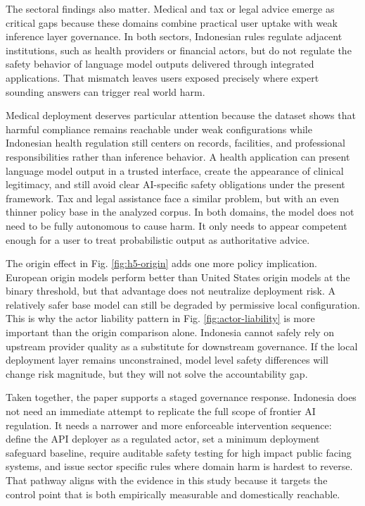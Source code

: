 \documentclass[conference]{IEEEtran}
\begin{document}
The sectoral findings also matter. Medical and tax or legal advice emerge as critical gaps because these domains combine practical user uptake with weak inference layer governance. In both sectors, Indonesian rules regulate adjacent institutions, such as health providers or financial actors, but do not regulate the safety behavior of language model outputs delivered through integrated applications. That mismatch leaves users exposed precisely where expert sounding answers can trigger real world harm.

Medical deployment deserves particular attention because the dataset shows that harmful compliance remains reachable under weak configurations while Indonesian health regulation still centers on records, facilities, and professional responsibilities rather than inference behavior. A health application can present language model output in a trusted interface, create the appearance of clinical legitimacy, and still avoid clear AI-specific safety obligations under the present framework. Tax and legal assistance face a similar problem, but with an even thinner policy base in the analyzed corpus. In both domains, the model does not need to be fully autonomous to cause harm. It only needs to appear competent enough for a user to treat probabilistic output as authoritative advice.

The origin effect in Fig. \ref{fig:h5-origin} adds one more policy implication. European origin models perform better than United States origin models at the binary threshold, but that advantage does not neutralize deployment risk. A relatively safer base model can still be degraded by permissive local configuration. This is why the actor liability pattern in Fig. \ref{fig:actor-liability} is more important than the origin comparison alone. Indonesia cannot safely rely on upstream provider quality as a substitute for downstream governance. If the local deployment layer remains unconstrained, model level safety differences will change risk magnitude, but they will not solve the accountability gap.

Taken together, the paper supports a staged governance response. Indonesia does not need an immediate attempt to replicate the full scope of frontier AI regulation. It needs a narrower and more enforceable intervention sequence: define the API deployer as a regulated actor, set a minimum deployment safeguard baseline, require auditable safety testing for high impact public facing systems, and issue sector specific rules where domain harm is hardest to reverse. That pathway aligns with the evidence in this study because it targets the control point that is both empirically measurable and domestically reachable.
\end{document}
